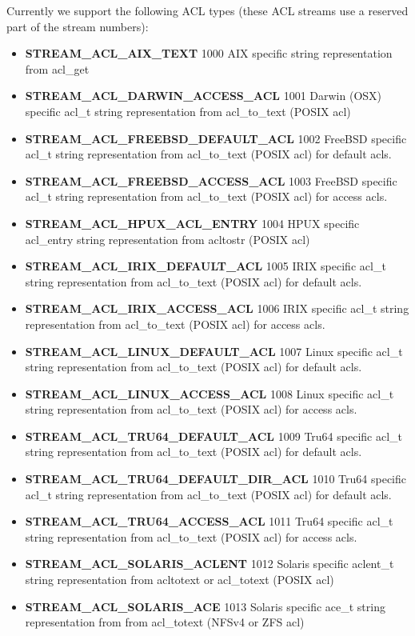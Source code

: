 Currently we support the following ACL types (these ACL streams use a reserved
part of the stream numbers):

\begin{itemize}
\item {\bf STREAM\_ACL\_AIX\_TEXT} 1000 AIX specific string representation from
  acl\_get
 \item {\bf STREAM\_ACL\_DARWIN\_ACCESS\_ACL} 1001 Darwin (OSX) specific acl\_t
   string representation from acl\_to\_text (POSIX acl)
  \item {\bf STREAM\_ACL\_FREEBSD\_DEFAULT\_ACL} 1002 FreeBSD specific acl\_t
    string representation from acl\_to\_text (POSIX acl) for default acls.
  \item {\bf STREAM\_ACL\_FREEBSD\_ACCESS\_ACL} 1003 FreeBSD specific acl\_t
    string representation from acl\_to\_text (POSIX acl) for access acls.
  \item {\bf STREAM\_ACL\_HPUX\_ACL\_ENTRY} 1004 HPUX specific acl\_entry
    string representation from acltostr (POSIX acl)
  \item {\bf STREAM\_ACL\_IRIX\_DEFAULT\_ACL} 1005 IRIX specific acl\_t string
    representation from acl\_to\_text (POSIX acl) for default acls.
  \item {\bf STREAM\_ACL\_IRIX\_ACCESS\_ACL} 1006 IRIX specific acl\_t string
    representation from acl\_to\_text (POSIX acl) for access acls.
  \item {\bf STREAM\_ACL\_LINUX\_DEFAULT\_ACL} 1007 Linux specific acl\_t
    string representation from acl\_to\_text (POSIX acl) for default acls.
  \item {\bf STREAM\_ACL\_LINUX\_ACCESS\_ACL} 1008 Linux specific acl\_t string
    representation from acl\_to\_text (POSIX acl) for access acls.
  \item {\bf STREAM\_ACL\_TRU64\_DEFAULT\_ACL} 1009 Tru64 specific acl\_t
    string representation from acl\_to\_text (POSIX acl) for default acls.
  \item {\bf STREAM\_ACL\_TRU64\_DEFAULT\_DIR\_ACL} 1010 Tru64 specific acl\_t
    string representation from acl\_to\_text (POSIX acl) for default acls.
  \item {\bf STREAM\_ACL\_TRU64\_ACCESS\_ACL} 1011 Tru64 specific acl\_t string
    representation from acl\_to\_text (POSIX acl) for access acls.
  \item {\bf STREAM\_ACL\_SOLARIS\_ACLENT} 1012 Solaris specific aclent\_t
    string representation from acltotext or acl\_totext (POSIX acl)
  \item {\bf STREAM\_ACL\_SOLARIS\_ACE} 1013 Solaris specific ace\_t string
    representation from from acl\_totext (NFSv4 or ZFS acl)
\end{itemize}

